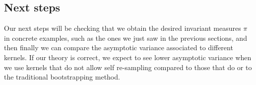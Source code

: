 \subsection{Next steps}
Our next steps will be checking that we obtain the desired invariant measures $\pi$ in concrete examples, such as the ones we just saw in the previous sections, and then finally we can compare the asymptotic variance associated to different kernels. If our theory is correct, we expect to see lower asymptotic variance when we use kernels that do not allow self re-sampling compared to those that do or to the traditional bootstrapping method.






